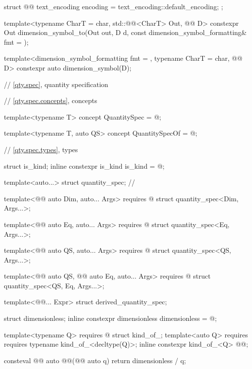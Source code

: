 \begin{codeblock}
{struct @@ {
  text_encoding encoding = text_encoding::default_encoding;
};

template<typename CharT = char, std::@@<CharT> Out, @@ D>
constexpr Out dimension_symbol_to(Out out, D d, const dimension_symbol_formatting& fmt = {});

template<dimension_symbol_formatting fmt = {}, typename CharT = char, @@ D>
constexpr auto dimension_symbol(D);

// \ref{qty.spec}, quantity specification

// \ref{qty.spec.concepts}, concepts

template<typename T>
concept QuantitySpec = @\seebelownc@;

template<typename T, auto QS>
concept QuantitySpecOf = @\seebelownc@;

// \ref{qty.spec.types}, types

struct is_kind;
inline constexpr is_kind is_kind = @\seebelownc@;

template<auto...>
struct quantity_spec;  // \notdef

template<@@ auto Dim, auto... Args>
  requires @\seebelownc@
struct quantity_spec<Dim, Args...>;

template<@@ auto Eq, auto... Args>
  requires @\seebelownc@
struct quantity_spec<Eq, Args...>;

template<@@ auto QS, auto... Args>
  requires @\seebelownc@
struct quantity_spec<QS, Args...>;

template<@@ auto QS, @@ auto Eq, auto... Args>
  requires @\seebelownc@
struct quantity_spec<QS, Eq, Args...>;

template<@@... Expr>
struct derived_quantity_spec;

struct dimensionless;
inline constexpr dimensionless dimensionless = @\seebelownc@;

template<typename Q>
  requires @\seebelownc@
struct kind_of_;
template<auto Q>
  requires requires { typename kind_of_<decltype(Q)>; }
inline constexpr kind_of_<Q> @@{};

consteval @@ auto @@(@@ auto q) { return dimensionless / q; }

}
\end{codeblock}

